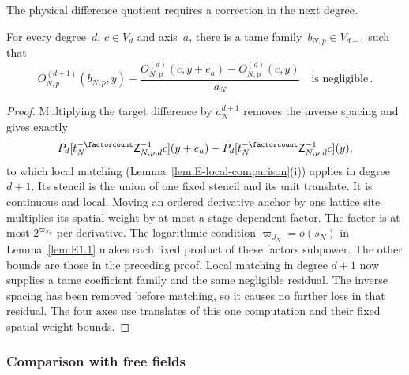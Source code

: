 The physical difference quotient requires a correction in the next degree.
\begin{lemma}\label{lem:E2.9}
For every degree~$d$, $c\in V_d$ and axis~$a$, there is a tame family~$b_{N,p}\in V_{d+1}$ such that
\begin{equation*}
O^{(d+1)}_{N,p}(b_{N,p},y)
-\frac{O^{(d)}_{N,p}(c,y+e_a)-O^{(d)}_{N,p}(c,y)}{a_N}
\quad\text{is negligible}\,.
\end{equation*}
\end{lemma}
\begin{proof}
Multiplying the target difference by $a_N^{d+1}$ removes the inverse spacing and gives exactly
\begin{equation*}
P_d[t_N^{-\factorcount}\mathsf Z_{N,p,d}^{-1}c](y+e_a)
-P_d[t_N^{-\factorcount}\mathsf Z_{N,p,d}^{-1}c](y),
\end{equation*}
to which local matching (Lemma~\ref{lem:E-local-comparison}(i)) applies in degree $d+1$. Its stencil is the union of one fixed stencil and its unit translate. It is continuous and local. Moving an ordered derivative anchor by one lattice site multiplies its spatial weight by at most a stage-dependent factor. The factor is at most $2^{\varpi_{J_N}}$ per derivative. The logarithmic condition $\varpi_{J_N}=o(s_N)$ in Lemma~\ref{lem:E1.1} makes each fixed product of these factors subpower. The other bounds are those in the preceding proof. Local matching in degree $d+1$ now supplies a tame coefficient family and the same negligible residual. The inverse spacing has been removed before matching, so it causes no further loss in that residual. The four axes use translates of this one computation and their fixed spatial-weight bounds.
\end{proof}

\subsubsection{Comparison with free fields}\label{sec:partII-E.2.5}

